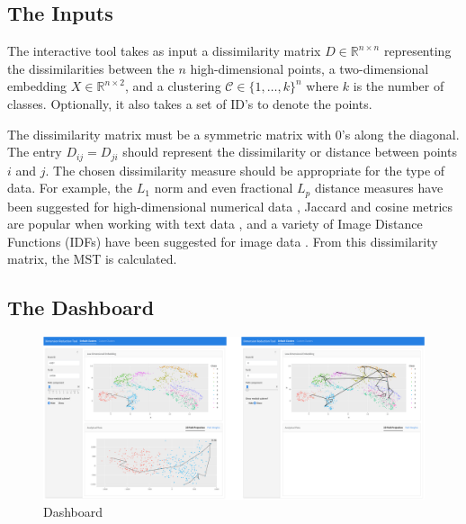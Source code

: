 \documentclass{article}
\begin{document}
\subsection{The Inputs}
The interactive tool takes as input a dissimilarity matrix $D \in \mathbb{R}^{n \times n}$ representing the dissimilarities between the $n$ high-dimensional points, a two-dimensional embedding $X \in \mathbb{R}^{n \times 2}$, and a clustering $\mathcal{C} \in \{1, \hdots, k\}^n$ where $k$ is the number of classes. Optionally, it also takes a set of ID's to denote the points.

The dissimilarity matrix must be a symmetric matrix with 0's along the diagonal. The entry $D_{ij} = D_{ji}$ should represent the dissimilarity or distance between points $i$ and $j$. The chosen dissimilarity measure should be appropriate for the type of data. For example, the $L_1$ norm and even fractional $L_p$ distance measures have been suggested for high-dimensional numerical data \cite{fractional Lp norms}, Jaccard and cosine metrics are popular when working with text data \cite{text data}, and a variety of Image Distance Functions (IDFs) have been suggested for image data \cite{image metrics}. From this dissimilarity matrix, the MST is calculated.

\subsection{The Dashboard}

\renewcommand{\figurename}{Figures}
\renewcommand{\thefigure}{1a and 1b}
\begin{figure}[t]
\centering
\includegraphics[scale=0.47]{dashboard}
\caption{Dashboard}
\end{figure}
\end{document}
